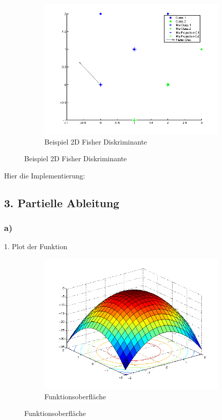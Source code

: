 \documentclass{article}
\begin{document}
	\begin{figure}[H]
	  \begin{subfigure}
	    \centering
	    \includegraphics[scale=0.8,bb=0 0 576 432]{fisher3.png}
		\caption{Beispiel 2D Fisher Diskriminante}
	  \end{subfigure}
	\end{figure}
	
	Hier die Implementierung:
	


\subsection*{3. Partielle Ableitung}
	 \subsubsection*{a)}
	 	1. Plot der Funktion
		\begin{figure}[H]
		  \begin{subfigure}
		    \centering
		    \includegraphics[scale=0.5,bb=0 0 576 432]{task3-f1.png}
			\caption{Funktionsoberfläche}
		  \end{subfigure}
		\end{figure}
	
\end{document}
